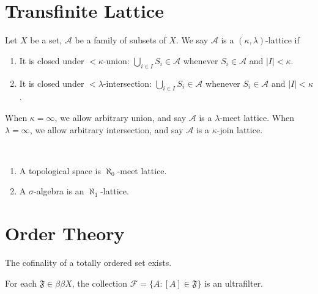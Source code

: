 \documentclass{treatise}
\begin{document}
\begin{shaded}
\section{Transfinite Lattice}
Let $X$ be a set, $\mathcal{A}$ be a family of subsets of $X$. We say $\mathcal{A}$ is a $(\kappa, \lambda)$-lattice if
\begin{enumerate}
	\item It is closed under $<\kappa$-union: $\bigcup_{i \in I} S_i \in \mathcal{A}$ whenever $S_i \in \mathcal{A}$ and $|I| < \kappa$.
	\item It is closed under $<\lambda$-intersection: $\bigcup_{i \in I} S_i \in \mathcal{A}$ whenever $S_i \in \mathcal{A}$ and $|I| < \kappa$.
\end{enumerate}
When $\kappa = \infty$, we allow arbitrary union, and say $\mathcal{A}$ is a $\lambda$-meet lattice. When $\lambda = \infty$, we allow arbitrary intersection, and say $\mathcal{A}$ is a $\kappa$-join lattice.
\begin{example} \ 
\begin{enumerate}
	\item A topological space is $\aleph_0$-meet lattice.
	\item A $\sigma$-algebra is an $\aleph_1$-lattice.
\end{enumerate}
\end{example}

\section{Order Theory}
\begin{theorem}
The cofinality of a totally ordered set exists.
\end{theorem}
\begin{theorem}
For each $\mathfrak{F} \in \beta \beta X$, the collection $\mathcal{F} = \{ A : [A] \in \mathfrak{F} \}$ is an ultrafilter.
\end{theorem}


\end{shaded}
\end{document}
